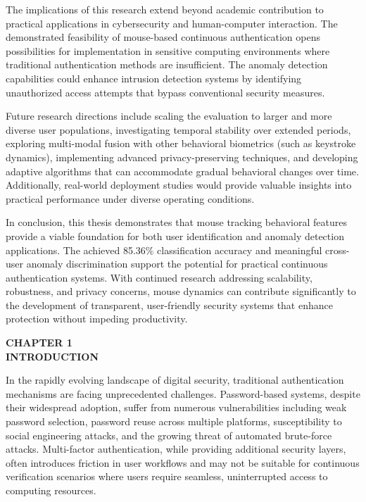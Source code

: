 \documentclass[
  12pt,
  a4paper,
]{report}
\begin{document}
The implications of this research extend beyond academic contribution to
practical applications in cybersecurity and human-computer interaction.
The demonstrated feasibility of mouse-based continuous authentication
opens possibilities for implementation in sensitive computing
environments where traditional authentication methods are insufficient.
The anomaly detection capabilities could enhance intrusion detection
systems by identifying unauthorized access attempts that bypass
conventional security measures.

Future research directions include scaling the evaluation to larger and
more diverse user populations, investigating temporal stability over
extended periods, exploring multi-modal fusion with other behavioral
biometrics (such as keystroke dynamics), implementing advanced
privacy-preserving techniques, and developing adaptive algorithms that
can accommodate gradual behavioral changes over time. Additionally,
real-world deployment studies would provide valuable insights into
practical performance under diverse operating conditions.

In conclusion, this thesis demonstrates that mouse tracking behavioral
features provide a viable foundation for both user identification and
anomaly detection applications. The achieved 85.36\% classification
accuracy and meaningful cross-user anomaly discrimination support the
potential for practical continuous authentication systems. With
continued research addressing scalability, robustness, and privacy
concerns, mouse dynamics can contribute significantly to the development
of transparent, user-friendly security systems that enhance protection
without impeding productivity.

\newpage

\newpage
\thispagestyle{plain}

\begin{center}
\vspace\*{2cm}
\textbf{\Large CHAPTER 1}\\[0.5cm]
\textbf{\Large INTRODUCTION}
\end{center}

\newpage

In the rapidly evolving landscape of digital security, traditional
authentication mechanisms are facing unprecedented challenges.
Password-based systems, despite their widespread adoption, suffer from
numerous vulnerabilities including weak password selection, password
reuse across multiple platforms, susceptibility to social engineering
attacks, and the growing threat of automated brute-force attacks.
Multi-factor authentication, while providing additional security layers,
often introduces friction in user workflows and may not be suitable for
continuous verification scenarios where users require seamless,
uninterrupted access to computing resources.
\end{document}
